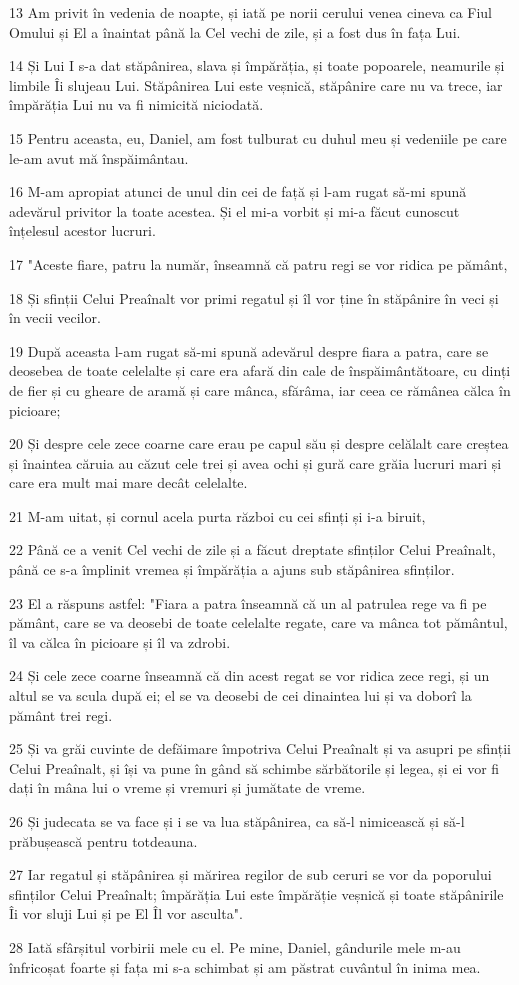 \par 13 Am privit în vedenia de noapte, și iată pe norii cerului venea cineva ca Fiul Omului și El a înaintat până la Cel vechi de zile, și a fost dus în fața Lui.
\par 14 Și Lui I s-a dat stăpânirea, slava și împărăția, și toate popoarele, neamurile și limbile Îi slujeau Lui. Stăpânirea Lui este veșnică, stăpânire care nu va trece, iar împărăția Lui nu va fi nimicită niciodată.
\par 15 Pentru aceasta, eu, Daniel, am fost tulburat cu duhul meu și vedeniile pe care le-am avut mă înspăimântau.
\par 16 M-am apropiat atunci de unul din cei de față și l-am rugat să-mi spună adevărul privitor la toate acestea. Și el mi-a vorbit și mi-a făcut cunoscut înțelesul acestor lucruri.
\par 17 "Aceste fiare, patru la număr, înseamnă că patru regi se vor ridica pe pământ,
\par 18 Și sfinții Celui Preaînalt vor primi regatul și îl vor ține în stăpânire în veci și în vecii vecilor.
\par 19 După aceasta l-am rugat să-mi spună adevărul despre fiara a patra, care se deosebea de toate celelalte și care era afară din cale de înspăimântătoare, cu dinți de fier și cu gheare de aramă și care mânca, sfărâma, iar ceea ce rămânea călca în picioare;
\par 20 Și despre cele zece coarne care erau pe capul său și despre celălalt care creștea și înaintea căruia au căzut cele trei și avea ochi și gură care grăia lucruri mari și care era mult mai mare decât celelalte.
\par 21 M-am uitat, și cornul acela purta război cu cei sfinți și i-a biruit,
\par 22 Până ce a venit Cel vechi de zile și a făcut dreptate sfinților Celui Preaînalt, până ce s-a împlinit vremea și împărăția a ajuns sub stăpânirea sfinților.
\par 23 El a răspuns astfel: "Fiara a patra înseamnă că un al patrulea rege va fi pe pământ, care se va deosebi de toate celelalte regate, care va mânca tot pământul, îl va călca în picioare și îl va zdrobi.
\par 24 Și cele zece coarne înseamnă că din acest regat se vor ridica zece regi, și un altul se va scula după ei; el se va deosebi de cei dinaintea lui și va doborî la pământ trei regi.
\par 25 Și va grăi cuvinte de defăimare împotriva Celui Preaînalt și va asupri pe sfinții Celui Preaînalt, și își va pune în gând să schimbe sărbătorile și legea, și ei vor fi dați în mâna lui o vreme și vremuri și jumătate de vreme.
\par 26 Și judecata se va face și i se va lua stăpânirea, ca să-l nimicească și să-l prăbușească pentru totdeauna.
\par 27 Iar regatul și stăpânirea și mărirea regilor de sub ceruri se vor da poporului sfinților Celui Preaînalt; împărăția Lui este împărăție veșnică și toate stăpânirile Îi vor sluji Lui și pe El Îl vor asculta".
\par 28 Iată sfârșitul vorbirii mele cu el. Pe mine, Daniel, gândurile mele m-au înfricoșat foarte și fața mi s-a schimbat și am păstrat cuvântul în inima mea.

